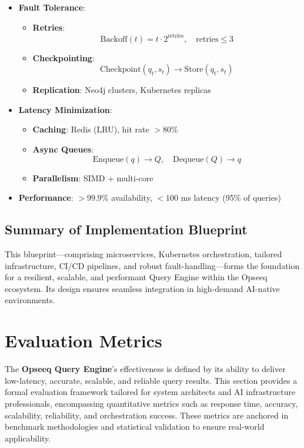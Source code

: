 \documentclass[11pt]{article}
\begin{document}
\begin{itemize}
    \item \textbf{Fault Tolerance}:
        \begin{itemize}
            \item \textbf{Retries}:
                \[
                \text{Backoff}(t) = t \cdot 2^{\text{retries}}, \quad \text{retries} \leq 3
                \]
            \item \textbf{Checkpointing}:
                \[
                \text{Checkpoint}(q_t, s_t) \rightarrow \text{Store}(q_t, s_t)
                \]
            \item \textbf{Replication}: Neo4j clusters, Kubernetes replicas
        \end{itemize}

    \item \textbf{Latency Minimization}:
        \begin{itemize}
            \item \textbf{Caching}: Redis (LRU), hit rate $ >80\% $
            \item \textbf{Async Queues}:
                \[
                \text{Enqueue}(q) \rightarrow Q,\quad \text{Dequeue}(Q) \rightarrow q
                \]
            \item \textbf{Parallelism}: SIMD + multi-core
        \end{itemize}

    \item \textbf{Performance}: $ >99.9\% $ availability, $ <100 $ ms latency (95\% of queries)
\end{itemize}

\subsection{Summary of Implementation Blueprint}

This blueprint—comprising microservices, Kubernetes orchestration, tailored infrastructure, CI/CD pipelines, and robust fault-handling—forms the foundation for a resilient, scalable, and performant Query Engine within the Opseeq ecosystem. Its design ensures seamless integration in high-demand AI-native environments.


\section{Evaluation Metrics}
\label{sec:evaluation}

The \textbf{Opseeq Query Engine}'s effectiveness is defined by its ability to deliver low-latency, accurate, scalable, and reliable query results. This section provides a formal evaluation framework tailored for system architects and AI infrastructure professionals, encompassing quantitative metrics such as response time, accuracy, scalability, reliability, and orchestration success. These metrics are anchored in benchmark methodologies and statistical validation to ensure real-world applicability.
\end{document}

